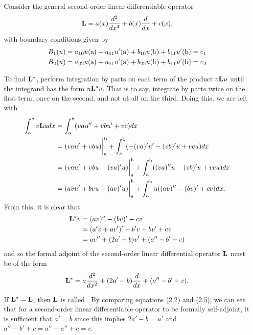 \begin{example}\label{ex:selfAdjoint}
	Consider the general second-order linear differentiable operator
	\begin{equation}\label{eq:secondOrder}
		\mathrm{\bf{L}}= a(x) \frac{d^2}{dx^2} + b(x)\frac{d}{dx} + c(x),
	\end{equation}
	with boundary conditions given by
	\begin{equation*}
		\begin{split}
			B_1(u) = a_{10}u(\mathrm{a}) + a_{11}u'(\mathrm{a}) + b_{10}u(\mathrm{b}) + b_{11}u'(\mathrm{b}) = c_1\\ 
			B_2(u) = a_{22}u(\mathrm{a}) + a_{11}u'(\mathrm{a}) + b_{22}u(\mathrm{b}) + b_{11}u'(\mathrm{b}) = c_2
		\end{split}
	\end{equation*}

	To find \(\mathrm{\bf{L^*}}  \), perform integration by parts on each term of the product \(v\mathrm{\bf{L}} u\) until the integrand has the form \(u \mathrm{\bf{L}}^* v\). That is to say, integrate by parts twice on the first term, once on the second, and not at all on the third. Doing this, we are left with
	\begin{equation}
		\begin{split}
			\int_\mathrm{a}^\mathrm{b} v\mathrm{\bf{L}} u dx &= \int_\mathrm{a}^\mathrm{b} (vau''+ vbu' + vc)dx\\
			&=(vau'+vbu)\biggr\rvert_\mathrm{a}^\mathrm{b} + \int_\mathrm{a}^\mathrm{b} (-(va)'u'-(vb)'u+vcu)dx\\
			&=(vau'+vbu-(va)'u)\biggr\rvert_\mathrm{a}^\mathrm{b} + \int_\mathrm{a}^\mathrm{b} ((va)''u-(vb)'u+vcu)dx\\
			&=(avu'+bvu-(av)'u)\biggr\rvert_\mathrm{a}^\mathrm{b} + \int_\mathrm{a}^\mathrm{b} u((av)''-(bv)'+cv)dx.
		\end{split}
	\end{equation}
	From this, it is clear that 
	\begin{equation}\label{eq:2OAdjoint}
		\begin{split}
			\mathrm{\bf{L^*}} v &= (av)''-(bv)'+cv\\
			     &= (a'v+av')'-b'v-bv'+cv\\
			     &= av''+(2a'-b)v'+(a''-b'+c)
		\end{split}
	\end{equation}
	and so the formal adjoint of the second-order linear differential operator \(\mathrm{\bf{L}}\) must be of the form
	\begin{equation}
		\begin{split}
			\mathrm{\bf{L^*}} =a\frac{d^2}{dx^2} + (2a'-b)\frac{d}{dx}+(a''-b'+c).
		\end{split}
	\end{equation}
	
	
	If \(\mathrm{\bf{L^*}}  = \mathrm{\bf{L}}\), then \( \mathrm{\bf{L}}\) is called . By comparing equations (2.2) and (2.5), we can see that for a second-order linear differentiable operator to be formally self-adjoint, it is sufficient that \(a'=b\) since this implies \(2a'-b=a'\) and \(a''-b'+c=a''-a''+c=c\).
\end{example}

